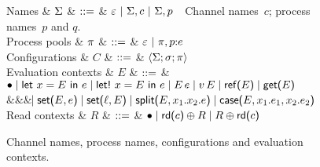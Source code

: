 \begin{figure*}
\centering
\begin{grammar}
  Names
  & $\Sigma$ 
    & $\mathrel{::=}$ & $\varepsilon ~|~ \Sigma, c ~|~ \Sigma, p$~\hspace*{10mm}~Channel names~$c$; process names~$p$ and $q$.
  \\[1mm]
  Process pools
  & $\pi$ 
    & $\mathrel{::=}$ & $\varepsilon ~|~ \pi, p{:}e$
    \\[1mm]
  Configurations
  & $C$
     & $\mathrel{::=}$ & $\left<\Sigma;\sigma;\pi\right> $
     \\[1mm]
 Evaluation contexts
  & $E$
     & $\mathrel{::=}$ & $\bullet \mathrel{\mid} \text{\textsf{let}}\ {x} = {E}\ \text{\textsf{in}}\ {e} \mathrel{\mid} \text{\textsf{let!}}\ {x} = {E}\ \text{\textsf{in}}\ {e} \mathrel{\mid}
 E\,e \mathrel{\mid} v\,E \mathrel{\mid} \text{\textsf{ref}}\textsf{(}{E}\textsf{)} \mathrel{\mid} \text{\textsf{get}}\textsf{(}{E}\textsf{)}$
     \\ &&& $\hspace{-1.02ex}\mathrel{\mid} \text{\textsf{set}}\textsf{(}{E},{e}\textsf{)} \mathrel{\mid} \text{\textsf{set}}\textsf{(}{\ell},{E}\textsf{)} \mathrel{\mid}
     \text{\textsf{split}}\textsf{(}{E},{x_1}.{x_2}.{e}\textsf{)} \mathrel{\mid} \text{\textsf{case}}\textsf{(}{E},{x_1}.{e_1},{x_2}.{e_2}\textsf{)}$
\\[1mm]
 Read contexts
  & $R$
     & $\mathrel{::=}$ & $\bullet \mathrel{\mid} \text{\textsf{rd}}\textsf{(}{c}\textsf{)} \oplus R \mathrel{\mid} R \oplus \text{\textsf{rd}}\textsf{(}{c}\textsf{)}$
\end{grammar}
\caption{Channel names, process names, configurations and evaluation contexts. }
\label{fig:configs}
\end{figure*}

